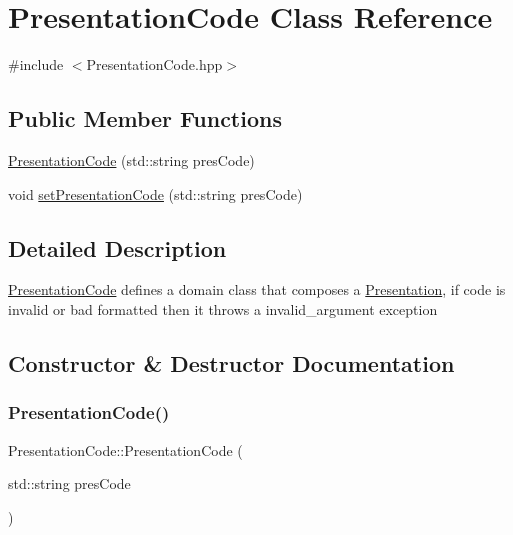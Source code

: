 \hypertarget{class_presentation_code}{}\section{Presentation\+Code Class Reference}
\label{class_presentation_code}


{\ttfamily \#include $<$Presentation\+Code.\+hpp$>$}

\subsection*{Public Member Functions}
\begin{DoxyCompactItemize}
\item 
\mbox{\hyperlink{class_presentation_code_a43a63ec18cb376608d60b9ff0e578444}{Presentation\+Code}} (std\+::string pres\+Code)
\item 
void \mbox{\hyperlink{class_presentation_code_a867e2a8c5da78c3eaabb9ed8918f9521}{set\+Presentation\+Code}} (std\+::string pres\+Code)
\end{DoxyCompactItemize}


\subsection{Detailed Description}
\mbox{\hyperlink{class_presentation_code}{Presentation\+Code}} defines a domain class that composes a \mbox{\hyperlink{class_presentation}{Presentation}}, if code is invalid or bad formatted then it throws a invalid\+\_\+argument exception 

\subsection{Constructor \& Destructor Documentation}
\mbox{\label{class_presentation_code_a43a63ec18cb376608d60b9ff0e578444}} 
\subsubsection{\texorpdfstring{PresentationCode()}{PresentationCode()}}
{\footnotesize\ttfamily Presentation\+Code\+::\+Presentation\+Code (\begin{DoxyParamCaption}\item[{std\+::string}]{pres\+Code }\end{DoxyParamCaption})}



